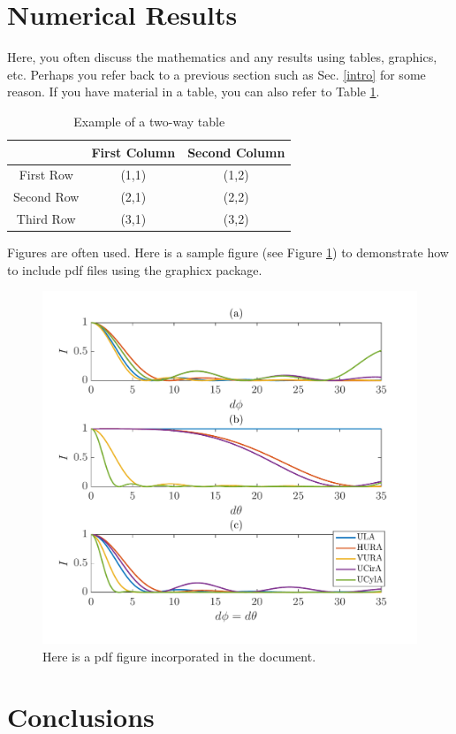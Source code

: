 \documentclass[conference]{IEEEtran}
\begin{document}
\section{Numerical Results}\label{NumRes}
 Here, you often discuss the mathematics and any results using tables, graphics, etc. Perhaps you refer back to a previous section such as Sec. \ref{intro} for some reason. If you have material in a table, you can also refer to Table \ref{table:example}.
 \begin{table}[ht]
 	\caption{Example of a two-way table}
 	\centering
 	\begin{tabular}{|c||c|c|}
 		\hline
 		&First Column&Second Column\\
 		\hline\hline
 		First Row& (1,1) & (1,2) \\
 		\hline
     	Second Row& (2,1) & (2,2) \\
    	\hline
    	Third Row& (3,1) & (3,2) \\
    	\hline
 	\end{tabular}
 	\label{table:example}
 \end{table}
Figures are often used. Here is a sample figure (see Figure \ref{fig:example}) to demonstrate how to include pdf files using the graphicx package.
 	\begin{figure}[ht]
	\centering
	\includegraphics[width=1\columnwidth]{sample_figure.pdf}
	\caption{Here is a pdf figure incorporated in the document.}
	\label{fig:example}
\end{figure}

 \section{Conclusions}\label{Conc}
\end{document}
